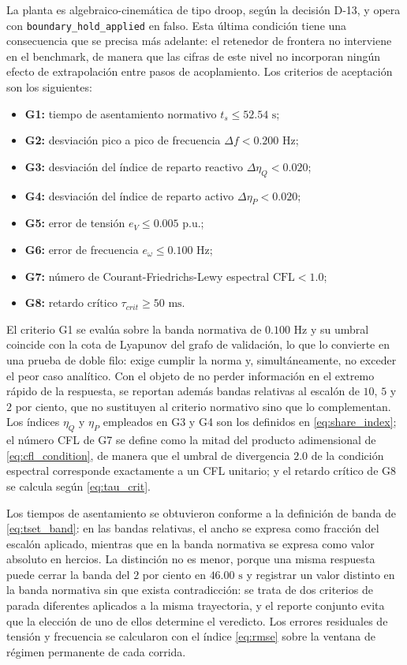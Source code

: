 La planta es algebraico-cinemática de tipo droop, según la decisión D-13, y opera con \texttt{boundary\_hold\_applied} en falso. Esta última condición tiene una consecuencia que se precisa más adelante: el retenedor de frontera no interviene en el benchmark, de manera que las cifras de este nivel no incorporan ningún efecto de extrapolación entre pasos de acoplamiento. Los criterios de aceptación son los siguientes:

\begin{itemize}
    \item \textbf{G1:} tiempo de asentamiento normativo $t_s \le 52.54\text{ s}$;
    \item \textbf{G2:} desviación pico a pico de frecuencia $\Delta f < 0.200\text{ Hz}$;
    \item \textbf{G3:} desviación del índice de reparto reactivo $\Delta \eta_Q < 0.020$;
    \item \textbf{G4:} desviación del índice de reparto activo $\Delta \eta_P < 0.020$;
    \item \textbf{G5:} error de tensión $e_V \le 0.005\text{ p.u.}$;
    \item \textbf{G6:} error de frecuencia $e_\omega \le 0.100\text{ Hz}$;
    \item \textbf{G7:} número de Courant-Friedrichs-Lewy espectral $\text{CFL} < 1.0$;
    \item \textbf{G8:} retardo crítico $\tau_{crit} \ge 50\text{ ms}$.
\end{itemize}

El criterio G1 se evalúa sobre la banda normativa de $0.100\text{ Hz}$ y su umbral coincide con la cota de Lyapunov del grafo de validación, lo que lo convierte en una prueba de doble filo: exige cumplir la norma y, simultáneamente, no exceder el peor caso analítico. Con el objeto de no perder información en el extremo rápido de la respuesta, se reportan además bandas relativas al escalón de $10$, $5$ y $2$ por ciento, que no sustituyen al criterio normativo sino que lo complementan. Los índices $\eta_Q$ y $\eta_P$ empleados en G3 y G4 son los definidos en \eqref{eq:share_index}; el número CFL de G7 se define como la mitad del producto adimensional de \eqref{eq:cfl_condition}, de manera que el umbral de divergencia $2.0$ de la condición espectral corresponde exactamente a un CFL unitario; y el retardo crítico de G8 se calcula según \eqref{eq:tau_crit}.

Los tiempos de asentamiento se obtuvieron conforme a la definición de banda de \eqref{eq:tset_band}: en las bandas relativas, el ancho se expresa como fracción del escalón aplicado, mientras que en la banda normativa se expresa como valor absoluto en hercios. La distinción no es menor, porque una misma respuesta puede cerrar la banda del $2$ por ciento en $46.00\text{ s}$ y registrar un valor distinto en la banda normativa sin que exista contradicción: se trata de dos criterios de parada diferentes aplicados a la misma trayectoria, y el reporte conjunto evita que la elección de uno de ellos determine el veredicto. Los errores residuales de tensión y frecuencia se calcularon con el índice \eqref{eq:rmse} sobre la ventana de régimen permanente de cada corrida.


